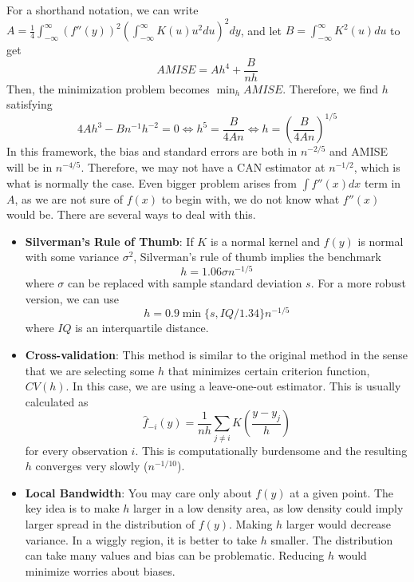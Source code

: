 \documentclass[12pt]{article}
\theoremstyle{definition}
\theoremstyle{property}
\theoremstyle{assumption}
\theoremstyle{example}
\theoremstyle{comment}
\begin{document}
 For a shorthand notation, we can write $A=\frac{1}{4}\int_{-\infty}^\infty(f''(y))^2\left(\int_{-\infty}^\infty K(u)u^2du\right)^2 dy$, and let $B=\int_{-\infty}^\infty K^2(u)du$ to get
 \[
 AMISE =Ah^4+\frac{B}{nh}
 \]
Then, the minimization problem becomes $\min_h AMISE$. Therefore, we find $h$ satisfying
 \[
 4Ah^3-Bn^{-1}h^{-2}=0\iff h^5=\frac{B}{4An} \iff h=\left(\frac{B}{4An}\right)^{1/5}
 \]
 In this framework, the bias and standard errors are both in $n^{-2/5}$ and AMISE will be in $n^{-4/5}$. Therefore, we may not have a CAN estimator at $n^{-1/2}$, which is what is normally the case. Even bigger problem arises from $\int f''(x)dx$ term in $A$, as we are not sure of $f(x)$ to begin with, we do not know what $f''(x)$ would be. There are several ways to deal with this.
 \begin{itemize}
 \item\textbf{Silverman's Rule of Thumb}: If $K$ is a normal kernel and $f(y)$ is normal with some variance $\sigma^2$, Silverman's rule of thumb implies the benchmark
 \[
 h=1.06\sigma n^{-1/5}
 \]
 where $\sigma$ can be replaced with sample standard deviation $s$. For a more robust version, we can use
 \[
 h=0.9 \min\{s,IQ/1.34\}n^{-1/5}
 \]
 where $IQ$ is an interquartile distance. 
 \item\textbf{Cross-validation}: This method is similar to the original method in the sense that we are selecting some $h$ that minimizes certain criterion function, $CV(h)$. In this case, we are using a leave-one-out estimator. This is usually calculated as
 \[
 \hat{f}_{-i}(y) = \frac{1}{nh}\sum_{j\neq i}K\left(\frac{y-y_j}{h}\right)
 \]
 for every observation $i$. This is computationally burdensome and the resulting $h$ converges very slowly ($n^{-1/10}$). 
  \item\textbf{Local Bandwidth}: You may care only about $f(y)$ at a given point. The key idea is to make $h$ larger in a low density area, as low density could imply larger spread in the distribution of $f(y)$. Making $h$ larger would decrease variance. In a wiggly region, it is better to take $h$ smaller. The distribution can take many values and bias can be problematic. Reducing $h$ would minimize worries about biases. 
 \end{itemize}

 
\end{document}
